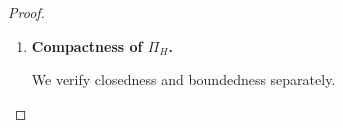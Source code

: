 \documentclass[12pt,openany]{book}
\newcommand{\bfw}{\mathbf{w}}
\newcommand{\calD}{\mathcal{D}}
\numberwithin{equation}{chapter}
\theoremstyle{plain}
\theoremstyle{definition}
\theoremstyle{remark}
\def\calD{D}%
\def\mathcal#1{#1}%
\def\bfw{w}%
\begin{document}
\begin{proof}
\begin{enumerate}
\begin{enumerate}
    \item \textit{Bucket bound.}
          \begin{align}
            \sum_{a \in \calD_k} \hat{w}_a
            &\;=\;
            \sum_{a \in \calD_k}
              \frac{w_{\max}^{(\calD_k)}}{S \cdot |\calD_k|}
            \;=\;
            \frac{w_{\max}^{(\calD_k)}}{S}
            \;\leq\;
            w_{\max}^{(\calD_k)},
            \label{eq:bucket-check}
          \end{align}
          since $S \geq 1$.

    \item \textit{Geography bound.}
          Because $\mathrm{geo}(g) \subseteq \{1,\ldots,n\}$ and
          $\hat{\bfw} \in \Delta^{n-1}$,
          \begin{align}
            \sum_{a \in \mathrm{geo}(g)} \hat{w}_a
            &\;\leq\;
            \sum_{a=1}^{n} \hat{w}_a
            \;=\; 1
            \;\leq\; w_{\max}^{(\mathrm{geo})}.
            \label{eq:geo-check}
          \end{align}
          The last inequality holds by \textbf{A3}.

    \item \textit{Currency bound.}
          By the same argument as~\eqref{eq:geo-check},
          \begin{align}
            \sum_{a \in \mathrm{cur}(c)} \hat{w}_a
            &\;\leq\; 1
            \;\leq\; w_{\max}^{(\mathrm{cur})}.
            \label{eq:cur-check}
          \end{align}

    \item \textit{Conclusion.}
          All constraints in~\eqref{eq:hard-feasible} are satisfied by
          $\hat{\bfw}$, so $\hat{\bfw} \in \Pi_H$ and $\Pi_H \neq \emptyset$.
  \end{enumerate}

\item \textbf{Compactness of $\Pi_H$.}

  We verify closedness and boundedness separately.


\end{enumerate}
\end{proof}
\end{document}
